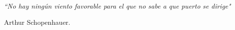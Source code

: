

\chapter*{}
\setlength{\leftmargin}{0.5\textwidth}
\setlength{\parsep}{0cm}
\addtolength{\topsep}{0.5cm}
\begin{flushright}
	\small\em{
		``No hay ningún viento favorable para el que no sabe a que puerto se dirige"
	}
\end{flushright}
\begin{flushright}
	\small{
		Arthur Schopenhauer.
	}
\end{flushright}
\cleardoublepage %

